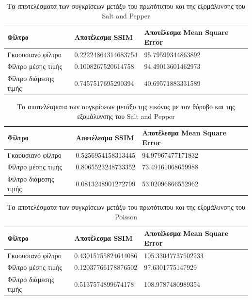 \begin{table}[H]
  \centering
  \begin{tabular}{| p{2cm} | p{7cm} | p{6.5cm} |}
  \hline
  \textbf{Φίλτρο} & \textbf{Αποτέλεσμα SSIM} & \textbf{Αποτέλεσμα Mean Square Error} \\
  \hline
  Γκαουσιανό φίλτρο & 0.22224864314683754 & 95.79599344863892 \\
  \hline
  Φίλτρο μέσης τιμής & 0.1008267520614758 & 94.49013601462973 \\
  \hline
  Φίλτρο διάμεσης τιμής & 0.7457517695290394 & 40.69571883331589 \\
  \hline
  \end{tabular}
  \caption{Τα αποτελέσματα των συγκρίσεων μετάξυ του πρωτότυπου και της εξομάλυνσης του Salt and Pepper}
  \label{tab:results_sp_no_noise}
\end{table}

\begin{table}[H]
  \centering
  \begin{tabular}{| p{2cm} | p{7cm} | p{6.5cm} |}
  \hline
  \textbf{Φίλτρο} & \textbf{Αποτέλεσμα SSIM} & \textbf{Αποτέλεσμα Mean Square Error} \\
  \hline
  Γκαουσιανό φίλτρο & 0.5256954158313445 & 94.97967477171832 \\
  \hline
  Φίλτρο μέσης τιμής & 0.8065523248733352 & 73.49161068659988 \\
  \hline
  Φίλτρο διάμεσης τιμής & 0.0813248901272799 & 53.02096866552962 \\
  \hline
  \end{tabular}
  \caption{Τα αποτελέσματα των συγκρίσεων μετάξυ της εικόνας με τον θόρυβο και της εξομάλυνσης του Salt and Pepper}
  \label{tab:results_sp_noise}
\end{table}

\begin{table}[H]
  \centering
  \begin{tabular}{| p{2cm} | p{7cm} | p{6.5cm} |}
  \hline
  \textbf{Φίλτρο} & \textbf{Αποτέλεσμα SSIM} & \textbf{Αποτέλεσμα Mean Square Error} \\
  \hline
  Γκαουσιανό φίλτρο & 0.43015755824644086 & 105.33047737502233 \\
  \hline
  Φίλτρο μέσης τιμής & 0.12037766178876502 & 97.6301775147929 \\
  \hline
  Φίλτρο διάμεσης τιμής & 0.5137574899674178 & 108.9787480989354 \\
  \hline
  \end{tabular}
  \caption{Τα αποτελέσματα των συγκρίσεων μετάξυ του πρωτότυπου και της εξομάλυνσης του Poisson}
  \label{tab:results_poisson_no_noise}
\end{table}


